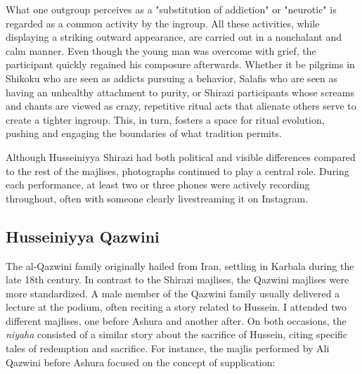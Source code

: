 What one outgroup perceives as a "substitution of addiction" or  "neurotic" is regarded as a common activity by the ingroup. All these activities, while displaying a striking outward appearance, are carried out in a nonchalant and calm manner. Even though the young man was overcome with grief, the participant quickly regained his composure afterwards. Whether it be pilgrims in Shikoku who are seen as addicts pursuing a behavior, Salafis who are seen as having an unhealthy attachment to purity, or Shirazi participants whose screams and chants are viewed as crazy, repetitive ritual acts that alienate others serve to create a tighter ingroup. This, in turn, fosters a space for ritual evolution, pushing and engaging the boundaries of what tradition permits.

Although Husseiniyya Shirazi had both political and visible differences compared to the rest of the majlises, photographs continued to play a central role. During each performance, at least two or three phones were actively recording throughout, often with someone clearly livestreaming it on Instagram.

\subsection{Husseiniyya Qazwini}
The al-Qazwini family originally hailed from Iran, settling in Karbala during the late 18th century. In contrast to the Shirazi majlises, the Qazwini majlises were more standardized. A male member of the Qazwini family usually delivered a lecture at the podium, often reciting a story related to Hussein. I attended two different majlises, one before Ashura and another after. On both occasions, the \emph{niyaha} consisted of a similar story about the sacrifice of Hussein, citing specific tales of redemption and sacrifice. For instance, the majlis performed by Ali Qazwini before Ashura focused on the concept of supplication:


